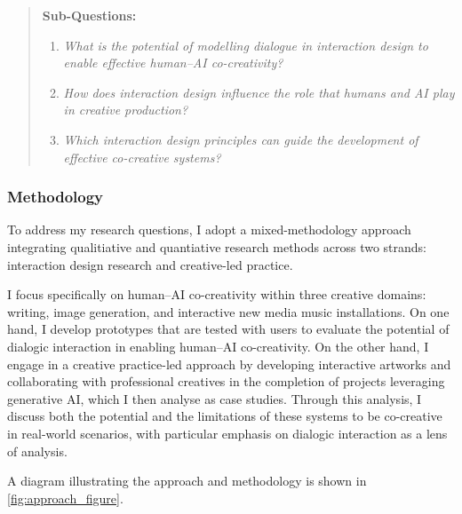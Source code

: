 \begin{quote}
\textbf{Sub-Questions:}
\begin{enumerate}
    \item \emph{What is the potential of modelling dialogue in interaction design to enable effective human--AI co-creativity?}
    \item \emph{How does interaction design influence the role that humans and AI play in creative production?}
    \item \emph{Which interaction design principles can guide the development of effective co-creative systems?} 
\end{enumerate}
\end{quote}

\subsubsection{Methodology}
To address my research questions, I adopt a mixed-methodology approach integrating qualitiative and quantiative research methods across two strands: interaction design research and creative-led practice.

I focus specifically on human–AI co-creativity within three creative domains: writing, image generation, and interactive new media music installations. On one hand, I develop prototypes that are tested with users to evaluate the potential of dialogic interaction in enabling human–AI co-creativity. On the other hand, I engage in a creative practice-led approach by developing interactive artworks and collaborating with professional creatives in the completion of projects leveraging generative AI, which I then analyse as case studies. Through this analysis, I discuss both the potential and the limitations of these systems to be co-creative in real-world scenarios, with particular emphasis on dialogic interaction as a lens of analysis.

A diagram illustrating the approach and methodology is shown in \ref{fig:approach_figure}.

